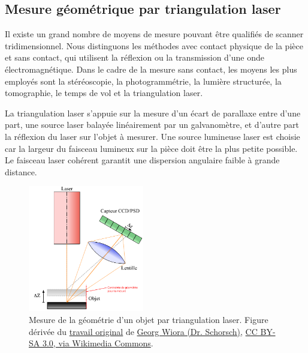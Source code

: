 \subsection{Mesure géométrique par triangulation laser} \label{subsec:scan3D}
Il existe un grand nombre de moyens de mesure pouvant être qualifiés de scanner tridimensionnel.
Nous distinguons les méthodes avec contact physique de la pièce et sans contact, qui utilisent la réflexion ou la transmission d'une onde électromagnétique.  %
Dans le cadre de la mesure sans contact, les moyens les plus employés sont la stéréoscopie, la photogrammétrie, la lumière structurée, la tomographie, le temps de vol et la triangulation laser.

La triangulation laser s'appuie sur la mesure d'un écart de parallaxe entre d'une part, une source laser balayée linéairement par un galvanomètre, et d'autre part la réflexion du laser sur l'objet à mesurer.  %
Une source lumineuse laser est choisie car la largeur du faisceau lumineux sur la pièce doit être la plus petite possible.
Le faisceau laser cohérent garantit une dispersion angulaire faible à grande distance.

\begin{figure}[htbp]
	\centering
	\includegraphics[width=0.45\textwidth]{../Chap2/Figures/Laserprofilometer_FR.pdf}
	\caption{Mesure de la géométrie d'un objet par triangulation laser. Figure dérivée du \href{https://commons.wikimedia.org/wiki/File:Laserprofilometer_EN.svg}{travail original} de \href{https://de.wikipedia.org/wiki/Benutzer:Xorx}{Georg Wiora (Dr. Schorsch)}, \href{http://creativecommons.org/licenses/by-sa/3.0/}{CC BY-SA 3.0, via Wikimedia Commons}.}
	\label{fig:laser_scanning}
\end{figure}

